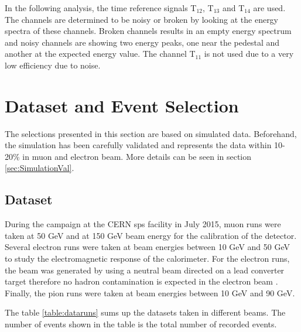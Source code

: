 In the following analysis, the time reference signals T$_{12}$, T$_{13}$ and T$_{14}$ are used. The channels are determined to be noisy or broken by looking at the energy spectra of these channels. Broken channels results in an empty energy spectrum and noisy channels are showing two energy peaks, one near the pedestal and another at the expected energy value. The channel T$_{11}$ is not used due to a very low efficiency due to noise.

\section{Dataset and Event Selection}

The selections presented in this section are based on simulated data. Beforehand, the simulation has been carefully validated and represents the data within 10-20\% in muon and electron beam. More details can be seen in section \ref{sec:SimulationVal}.

\subsection{Dataset}
\label{subsec:dataset}

During the campaign at the CERN \acrshort{sps} facility in July 2015, muon runs were taken at 50 GeV and at 150 GeV beam energy for the calibration of the detector. Several electron runs were taken at beam energies between 10 GeV and 50 GeV to study the electromagnetic response of the calorimeter. For the electron runs, the beam was generated by using a neutral beam directed on a lead converter target therefore no hadron contamination is expected in the electron beam \cite{H2Beamline}. Finally, the pion runs were taken at beam energies between 10 GeV and 90 GeV.

The table \ref{table:dataruns} sums up the datasets taken in different beams. The number of events shown in the table is the total number of recorded events.

